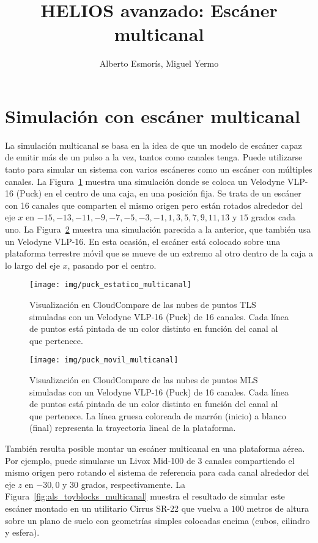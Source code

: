 \documentclass[]{article}
\title{HELIOS avanzado: Escáner multicanal}
\author{Alberto Esmorís, Miguel Yermo}
\date{}
\begin{document}
	
	\maketitle
	
	
	
	\section*{Simulación con escáner multicanal}
	La simulación multicanal se basa en la idea de que un modelo de escáner capaz de emitir más de un pulso a la vez, tantos como canales tenga. Puede utilizarse tanto para simular un sistema con varios escáneres como un escáner con múltiples canales. La Figura~\ref{fig:puck_estatico_multicanal} muestra una simulación donde se coloca un Velodyne VLP-16 (Puck) en el centro de una caja, en una posición fija. Se trata de un escáner con 16 canales que comparten el mismo origen pero están rotados alrededor del eje $x$ en $-15, -13, -11, -9, -7, -5, -3, -1, 1, 3, 5, 7, 9, 11, 13$ y $15$ grados cada uno. La Figura~\ref{fig:puck_movil_multicanal} muestra una simulación parecida a la anterior, que también usa un Velodyne VLP-16. En esta ocasión, el escáner está colocado sobre una plataforma terrestre móvil que se mueve de un extremo al otro dentro de la caja a lo largo del eje $x$, pasando por el centro.
	
	\begin{figure}[htb]
		\centering
		\texttt{[image: img/puck\_estatico\_multicanal]}
		\caption{Visualización en CloudCompare de las nubes de puntos TLS simuladas con un Velodyne VLP-16 (Puck) de 16 canales. Cada línea de puntos está pintada de un color distinto en función del canal al que pertenece.}
		\label{fig:puck_estatico_multicanal}
	\end{figure}

	\begin{figure}[htb]
		\centering
		\texttt{[image: img/puck\_movil\_multicanal]}
		\caption{Visualización en CloudCompare de las nubes de puntos MLS simuladas con un Velodyne VLP-16 (Puck) de 16 canales. Cada línea de puntos está pintada de un color distinto en función del canal al que pertenece. La línea gruesa coloreada de marrón (inicio) a blanco (final) representa la trayectoria lineal de la plataforma.}
		\label{fig:puck_movil_multicanal}
	\end{figure}


	También resulta posible montar un escáner multicanal en una plataforma aérea. Por ejemplo, puede simularse un Livox Mid-100 de 3 canales compartiendo el mismo origen pero rotando el sistema de referencia para cada canal alrededor del eje $z$ en $-30, 0$ y $30$ grados, respectivamente. La Figura~\ref{fig:als_toyblocks_multicanal} muestra el resultado de simular este escáner montado en un utilitario Cirrus SR-22 que vuelva a $100$ metros de altura sobre un plano de suelo con geometrías simples colocadas encima (cubos, cilindro y esfera).
\end{document}
